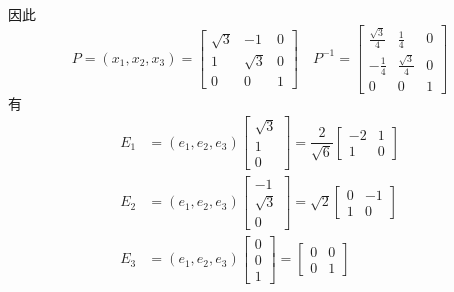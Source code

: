 \documentclass[12pt, a4paper, oneside, fontset=none]{ctexart}
\begin{document}
因此
\[
    P = (x_1,x_2,x_3) = \begin{bmatrix}
        \sqrt{3} & -1       & 0 \\
        1        & \sqrt{3} & 0 \\
        0        & 0        & 1
    \end{bmatrix}\quad P^{-1} = \begin{bmatrix}
        \frac{\sqrt{3}}{4} & \frac{1}{4}        & 0 \\
        -\frac{1}{4}       & \frac{\sqrt{3}}{4} & 0 \\
        0                  & 0                  & 1
    \end{bmatrix}
\]
有
\begin{align*}
    E_1 & = (e_1,e_2,e_3)\begin{bmatrix}
                             \sqrt{3} \\
                             1        \\
                             0
                         \end{bmatrix}
    = \dfrac{2}{\sqrt{6}}\begin{bmatrix}
                             -2 & 1 \\
                             1  & 0
                         \end{bmatrix} \\
    E_2 & = (e_1,e_2,e_3)\begin{bmatrix}
                             -1       \\
                             \sqrt{3} \\
                             0
                         \end{bmatrix}
    = \sqrt{2}\begin{bmatrix}
                  0 & -1 \\
                  1 & 0
              \end{bmatrix}            \\
    E_3 & =(e_1,e_2,e_3)\begin{bmatrix}
                            0 \\
                            0 \\
                            1
                        \end{bmatrix}
    = \begin{bmatrix}
          0 & 0 \\
          0 & 1
      \end{bmatrix}
\end{align*}
\end{document}

